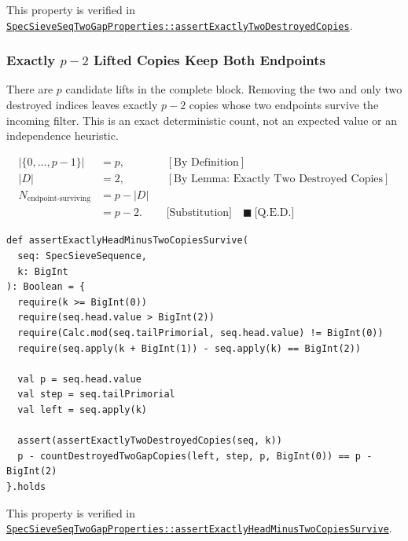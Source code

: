 {\raggedright
This property is verified in
\href{https://github.com/thiagomata/prime-numbers/blob/master/src/main/scala/v1/chapter6/sieve/seq/spec/properties/SpecSieveSeqTwoGapProperties.scala}{\texttt{SpecSieveSeqTwoGapProperties::assertExactlyTwoDestroyedCopies}}.
\par}

\subsubsection{Exactly \texorpdfstring{$p-2$}{p-2} Lifted Copies Keep Both Endpoints}
\label{sec:exactly-p-minus-two-copies-survive}

There are $p$ candidate lifts in the complete block. Removing the two and
only two destroyed indices leaves exactly $p-2$ copies whose two
endpoints survive the incoming filter. This is an exact deterministic
count, not an expected value or an independence heuristic.

\begin{equation*}
\begin{aligned}
|\{0,\ldots,p-1\}|&=p,
&&[\text{By Definition}]\\
|D|&=2,
&&[\text{By Lemma: Exactly Two Destroyed Copies}]\\
N_{\mathrm{endpoint\text{-}surviving}}
&=p-|D|\\
&=p-2.
&&\text{[Substitution]}\quad\blacksquare\ \text{[Q.E.D.]}
\end{aligned}
\end{equation*}

\begin{lstlisting}[style=scala]
def assertExactlyHeadMinusTwoCopiesSurvive(
  seq: SpecSieveSequence,
  k: BigInt
): Boolean = {
  require(k >= BigInt(0))
  require(seq.head.value > BigInt(2))
  require(Calc.mod(seq.tailPrimorial, seq.head.value) != BigInt(0))
  require(seq.apply(k + BigInt(1)) - seq.apply(k) == BigInt(2))

  val p = seq.head.value
  val step = seq.tailPrimorial
  val left = seq.apply(k)

  assert(assertExactlyTwoDestroyedCopies(seq, k))
  p - countDestroyedTwoGapCopies(left, step, p, BigInt(0)) == p - BigInt(2)
}.holds
\end{lstlisting}

{\raggedright
This property is verified in
\href{https://github.com/thiagomata/prime-numbers/blob/master/src/main/scala/v1/chapter6/sieve/seq/spec/properties/SpecSieveSeqTwoGapProperties.scala}{\texttt{SpecSieveSeqTwoGapProperties::assertExactlyHeadMinusTwoCopiesSurvive}}.
\par}

